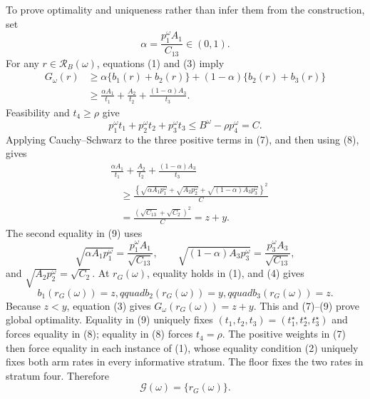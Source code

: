 To prove optimality and uniqueness rather than infer them from the construction, set
\[
 \alpha=\frac{p_1^\omega A_1}{C_{13}}\in(0,1).
\]
For any \(r\in\mathcal R_B(\omega)\), equations (1) and (3) imply
\[
\begin{aligned}
 G_\omega(r)
 &\geq \alpha\{b_1(r)+b_2(r)\}
       +(1-\alpha)\{b_2(r)+b_3(r)\}\\
 &\geq \frac{\alpha A_1}{t_1}+\frac{A_2}{t_2}
       +\frac{(1-\alpha)A_3}{t_3}.
\end{aligned}
 \tag{7}
\]
Feasibility and \(t_4\geq\rho\) give
\[
 p_1^\omega t_1+p_2^\omega t_2+p_3^\omega t_3
 \leq B^\omega-\rho p_4^\omega=C.
 \tag{8}
\]
Applying Cauchy--Schwarz to the three positive terms in (7), and then using (8), gives
\[
\begin{aligned}
 &\frac{\alpha A_1}{t_1}+\frac{A_2}{t_2}
       +\frac{(1-\alpha)A_3}{t_3}\\
 &\quad\geq
 \frac{\left\{\sqrt{\alpha A_1p_1^\omega}
 +\sqrt{A_2p_2^\omega}
 +\sqrt{(1-\alpha)A_3p_3^\omega}\right\}^2}{C}\\
 &\quad=
 \frac{(\sqrt{C_{13}}+\sqrt{C_2})^2}{C}
 =z+y.
\end{aligned}
 \tag{9}
\]
The second equality in (9) uses
\[
 \sqrt{\alpha A_1p_1^\omega}=\frac{p_1^\omega A_1}{\sqrt{C_{13}}},
 \qquad
 \sqrt{(1-\alpha)A_3p_3^\omega}
 =\frac{p_3^\omega A_3}{\sqrt{C_{13}}},
\]
and \(\sqrt{A_2p_2^\omega}=\sqrt{C_2}\).  At \(r_G(\omega)\), equality holds in (1), and (4) gives
\[
 b_1(r_G(\omega))=z,qquad
 b_2(r_G(\omega))=y,qquad
 b_3(r_G(\omega))=z.
\]
Because \(z<y\), equation (3) gives \(G_\omega(r_G(\omega))=z+y\).  This and (7)--(9) prove global optimality.  Equality in (9) uniquely fixes \((t_1,t_2,t_3)=(t_1^\star,t_2^\star,t_3^\star)\) and forces equality in (8); equality in (8) forces \(t_4=\rho\).  The positive weights in (7) then force equality in each instance of (1), whose equality condition (2) uniquely fixes both arm rates in every informative stratum.  The floor fixes the two rates in stratum four.  Therefore
\[
 \mathcal G(\omega)=\{r_G(\omega)\}.
 \tag{10}
\]

